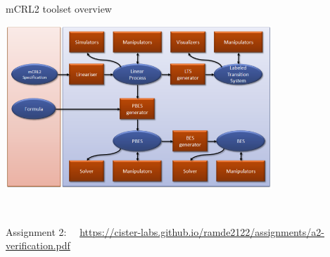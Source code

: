 \documentclass[aspectratio=169]{beamer}
\begin{document}
\begin{slide}{mCRL2 toolset overview}
  \centering
  
  \includegraphics[width=0.75\textwidth]{images/mcrl2-toolset.png}
  
  \\[-10mm]
  \begin{block}{}\centering
    Assignment 2:~~
  \mbox{\alert{\footnotesize\url{https://cister-labs.github.io/ramde2122/assignments/a2-verification.pdf}}}
  \end{block}
\end{slide}
\end{document}
